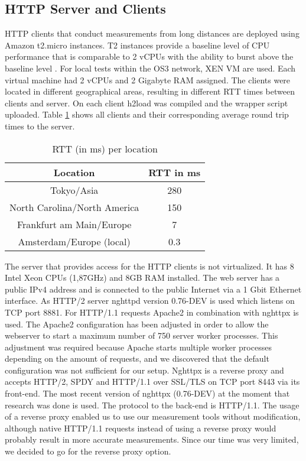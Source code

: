 \subsection{HTTP Server and Clients}
\label{subsec:server_client}
HTTP clients that conduct measurements from long distances are deployed using Amazon t2.micro instances. T2 instances provide a baseline level of CPU performance that is comparable to 2 vCPUs with the ability to burst above the baseline level \cite{amazon-ts}. For local tests within the OS3 network, XEN VM are used. Each virtual machine had 2 vCPUs and 2 Gigabyte RAM assigned. The clients were located in different geographical areas, resulting in different RTT times between clients and server. On each client h2load was compiled and the wrapper script uploaded. Table \ref{table:locations} shows all clients and their corresponding average round trip times to the server.

\begin{table}[h]
	\centering
\begin{tabular}{ | c | c | }

\hline
\textbf{Location} & \textbf{RTT in ms}\\ \hline \hline
Tokyo/Asia &  280\\ \hline
North Carolina/North America &  150\\ \hline 
Frankfurt am Main/Europe &  7\\ \hline
Amsterdam/Europe (local) &  0.3\\

\hline
\end{tabular}
\caption{RTT (in ms) per location}
\label{table:locations}
\end{table}

The server that provides access for the HTTP clients is not virtualized. It has 8 Intel Xeon CPUs (1,87GHz) and 8GB RAM installed. The web server has a public IPv4 address and is connected to the public Internet via a 1 Gbit Ethernet interface. As HTTP/2 server nghttpd \cite{nghttp} version 0.76-DEV is used which listens on TCP port 8881. For HTTP/1.1 requests Apache2 \cite{apache2} in combination with nghttpx \cite{nghttpx} is used. The Apache2 configuration has been adjusted in order to allow the webserver to start a maximum number of 750 server worker processes. This adjustment was required because Apache starts multiple worker processes depending on the amount of requests, and we discovered that the default configuration was not sufficient for our setup. Nghttpx is a reverse proxy and accepts HTTP/2, SPDY and HTTP/1.1 over SSL/TLS on TCP port 8443 via its front-end. The most recent version of nghttpx (0.76-DEV) at the moment that research was done is used. The protocol to the back-end is HTTP/1.1. The usage of a reverse proxy enabled us to use our measurement tools without modification, although native HTTP/1.1 requests instead of using a reverse proxy would probably result in more accurate measurements. Since our time was very limited, we decided to go for the reverse proxy option.

